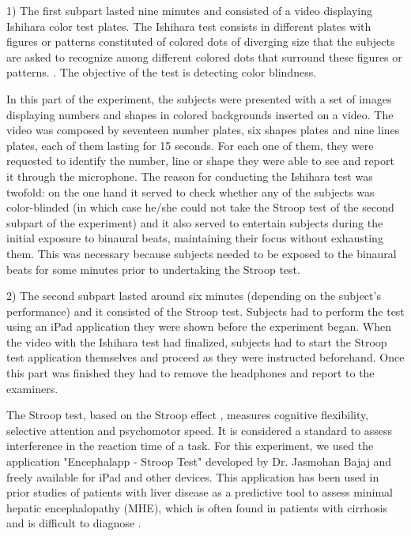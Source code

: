 \documentclass[10pt]{article}
\begin{document}
1) The first subpart lasted nine minutes and consisted of a video displaying Ishihara color test plates. The Ishihara test consists in different plates with figures or patterns constituted of colored dots of diverging size that the subjects are asked to recognize among different colored dots that surround these figures or patterns.  \cite{rosenfield2009optometry}. The objective of the test is detecting color blindness.
 
In this part of the experiment, the subjects were presented with a set of images displaying numbers and shapes in colored backgrounds inserted on a video. The video was composed by seventeen number plates, six shapes plates and nine lines plates, each of them lasting for 15 seconds. For each one of them, they were requested to identify the number, line or shape they were able to see and report it through the microphone. The reason for conducting the Ishihara test was twofold: on the one hand it served to check whether any of the subjects was color-blinded (in which case he/she could not take the Stroop test of the second subpart of the experiment) and it also served to entertain subjects during the initial exposure to binaural beats, maintaining their focus without exhausting them. This was necessary because subjects needed to be exposed to the binaural beats for some minutes prior to undertaking the Stroop test.
 
2) The second subpart lasted around six minutes (depending on the subject’s performance) and it consisted of the Stroop test. Subjects had to perform the test using an iPad application they were shown before the experiment began. When the video with the Ishihara test had finalized, subjects had to start the Stroop test application themselves and proceed as they were instructed beforehand. Once this part was finished they had to remove the headphones and report to the examiners.
 
The Stroop test, based on the Stroop effect \cite{stroop1935studies}, measures cognitive flexibility, selective attention and psychomotor speed. It is considered a standard to assess interference in the reaction time of a task. For this experiment, we used the application "Encephalapp - Stroop Test" developed by Dr. Jasmohan Bajaj and freely available for iPad and other devices. This application has been used in prior studies of patients with liver disease as a predictive tool to assess minimal hepatic encephalopathy (MHE), which is often found in patients with cirrhosis and is difficult to diagnose \cite{Bajaj2013a}.
 
\end{document}
